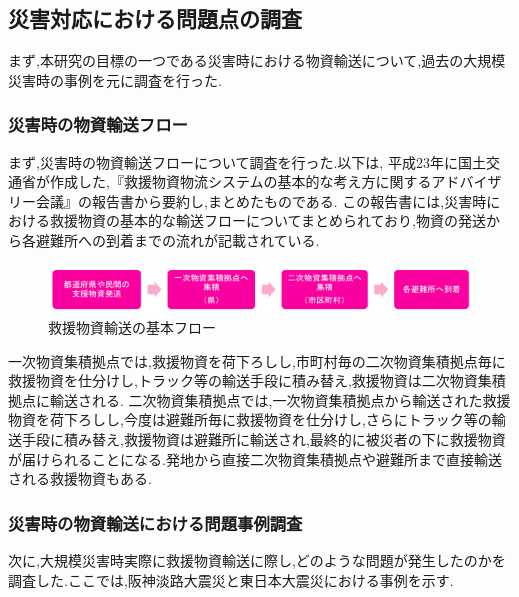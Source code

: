 \documentclass{article}[jsarticle]
\begin{document}
\subsection{災害対応における問題点の調査}
まず,本研究の目標の一つである災害時における物資輸送について,過去の大規模災害時の事例を元に調査を行った.
\subsubsection{災害時の物資輸送フロー}
まず,災害時の物資輸送フローについて調査を行った.以下は, 平成23年に国土交通省が作成した,『救援物資物流システムの基本的な考え方に関するアドバイザリー会議』の報告書から要約し,まとめたものである.
この報告書には,災害時における救援物資の基本的な輸送フローについてまとめられており,物資の発送から各避難所への到着までの流れが記載されている.
\begin{figure}[H]
    \centering
    \includegraphics[scale=0.7]{./Images/20240127180600.png}
    \caption{救援物資輸送の基本フロー}
\end{figure}
一次物資集積拠点では,救援物資を荷下ろしし,市町村毎の二次物資集積拠点毎に救援物資を仕分けし,トラック等の輸送手段に積み替え,救援物資は二次物資集積拠点に輸送される.
二次物資集積拠点では,一次物資集積拠点から輸送された救援物資を荷下ろしし,今度は避難所毎に救援物資を仕分けし,さらにトラック等の輸送手段に積み替え,救援物資は避難所に輸送され,最終的に被災者の下に救援物資が届けられることになる.発地から直接二次物資集積拠点や避難所まで直接輸送される救援物資もある.\par 

\subsubsection{災害時の物資輸送における問題事例調査}
次に,大規模災害時実際に救援物資輸送に際し,どのような問題が発生したのかを調査した.ここでは,阪神淡路大震災と東日本大震災における事例を示す.
\end{document}
